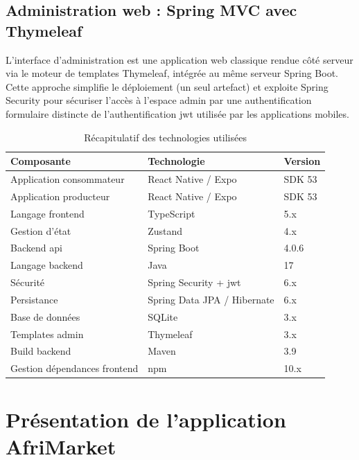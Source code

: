 \documentclass[12pt, a4paper, oneside]{report}
\begin{document}
\subsection{Administration web : Spring MVC avec Thymeleaf}

L'interface d'administration est une application web classique rendue côté serveur via le
moteur de templates Thymeleaf, intégrée au même serveur Spring Boot. Cette approche
simplifie le déploiement (un seul artefact) et exploite Spring Security pour sécuriser
l'accès à l'espace admin par une authentification formulaire distincte de l'authentification
\gls{jwt} utilisée par les applications mobiles.

\begin{table}[H]
  \centering
  \caption{Récapitulatif des technologies utilisées}
  \label{tab:technologies}
  \begin{tabular}{|l|l|l|}
    \hline
    \textbf{Composante} & \textbf{Technologie} & \textbf{Version} \\
    \hline
    Application consommateur & React Native / Expo & SDK 53 \\
    \hline
    Application producteur  & React Native / Expo & SDK 53 \\
    \hline
    Langage frontend & TypeScript & 5.x \\
    \hline
    Gestion d'état & Zustand & 4.x \\
    \hline
    Backend \gls{api} & Spring Boot & 4.0.6 \\
    \hline
    Langage backend & Java & 17 \\
    \hline
    Sécurité & Spring Security + \gls{jwt} & 6.x \\
    \hline
    Persistance & Spring Data JPA / Hibernate & 6.x \\
    \hline
    Base de données & SQLite & 3.x \\
    \hline
    Templates admin & Thymeleaf & 3.x \\
    \hline
    Build backend & Maven & 3.9 \\
    \hline
    Gestion dépendances frontend & npm & 10.x \\
    \hline
  \end{tabular}
\end{table}

\section{Présentation de l'application AfriMarket}
\end{document}
